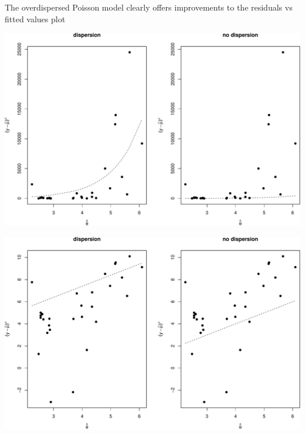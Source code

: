 \documentclass[
  ignorenonframetext,
]{beamer}
\begin{document}
\begin{frame}{}
\protect\hypertarget{section-7}{}
The overdispersed Poisson model clearly offers improvements to the
residuals vs fitted values plot

\vspace{12pt}
\tiny

\includegraphics{week5_p1_files/figure-beamer/unnamed-chunk-6-1.pdf}
\end{frame}

\begin{frame}{}
\protect\hypertarget{section-8}{}
\includegraphics{week5_p1_files/figure-beamer/unnamed-chunk-7-1.pdf}
\end{frame}
\end{document}

